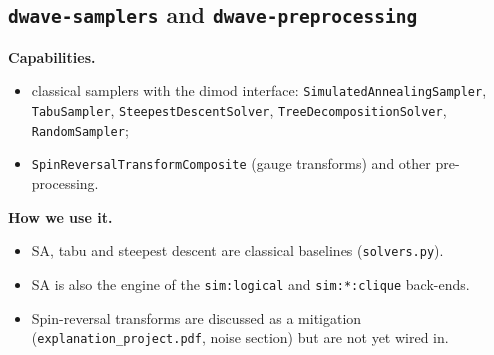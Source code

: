 \documentclass[11pt,a4paper]{article}
\newcommand{\code}[1]{\nolinkurl{#1}}
\begin{document}
\subsection{\texorpdfstring{\code{dwave-samplers}}{dwave-samplers} and \texorpdfstring{\code{dwave-preprocessing}}{dwave-preprocessing}}
\textbf{Capabilities.}
\begin{itemize}
\item classical samplers with the dimod interface: \code{SimulatedAnnealingSampler}, \code{TabuSampler}, \code{SteepestDescentSolver}, \code{TreeDecompositionSolver}, \code{RandomSampler};
\item \code{SpinReversalTransformComposite} (gauge transforms) and other pre-processing.
\end{itemize}

\textbf{How we use it.}
\begin{itemize}
\item SA, tabu and steepest descent are classical baselines (\code{solvers.py}).
\item SA is also the engine of the \code{sim:logical} and \code{sim:*:clique} back-ends.
\item Spin-reversal transforms are discussed as a mitigation (\code{explanation_project.pdf}, noise section) but are not yet wired in.
\end{itemize}

\end{document}

